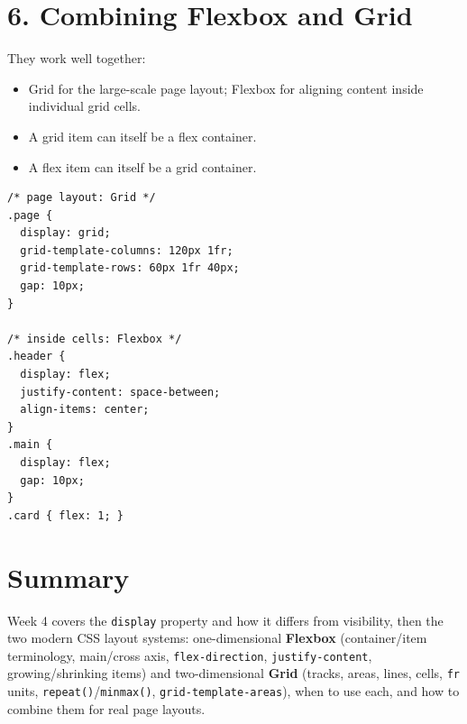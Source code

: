 \documentclass[12pt]{article}
\begin{document}
\section{6. Combining Flexbox and Grid}
They work well together:
\begin{itemize}
    \item Grid for the large-scale page layout; Flexbox for aligning content inside individual grid cells.
    \item A grid item can itself be a flex container.
    \item A flex item can itself be a grid container.
\end{itemize}
\begin{lstlisting}
/* page layout: Grid */
.page {
  display: grid;
  grid-template-columns: 120px 1fr;
  grid-template-rows: 60px 1fr 40px;
  gap: 10px;
}

/* inside cells: Flexbox */
.header {
  display: flex;
  justify-content: space-between;
  align-items: center;
}
.main {
  display: flex;
  gap: 10px;
}
.card { flex: 1; }
\end{lstlisting}

\section{Summary}
Week 4 covers the \texttt{display} property and how it differs from visibility, then the two modern CSS layout systems: one-dimensional \textbf{Flexbox} (container/item terminology, main/cross axis, \texttt{flex-direction}, \texttt{justify-content}, growing/shrinking items) and two-dimensional \textbf{Grid} (tracks, areas, lines, cells, \texttt{fr} units, \texttt{repeat()}/\texttt{minmax()}, \texttt{grid-template-areas}), when to use each, and how to combine them for real page layouts.
\end{document}
